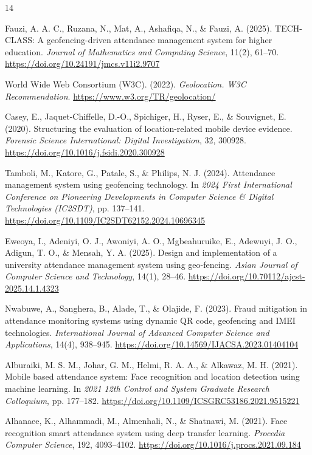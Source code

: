 \documentclass[runningheads]{llncs}
\begin{document}
%
\begin{thebibliography}{14}
\small

Fauzi, A. A. C., Ruzana, N., Mat, A., Ashafiqa, N., \& Fauzi, A. (2025). TECH-CLASS: A geofencing-driven attendance management system for higher education. \textit{Journal of Mathematics and Computing Science}, 11(2), 61--70. \url{https://doi.org/10.24191/jmcs.v11i2.9707}

World Wide Web Consortium (W3C). (2022). \textit{Geolocation. W3C Recommendation}. \url{https://www.w3.org/TR/geolocation/}

Casey, E., Jaquet-Chiffelle, D.-O., Spichiger, H., Ryser, E., \& Souvignet, E. (2020). Structuring the evaluation of location-related mobile device evidence. \textit{Forensic Science International: Digital Investigation}, 32, 300928. \url{https://doi.org/10.1016/j.fsidi.2020.300928}

Tamboli, M., Katore, G., Patale, S., \& Philips, N. J. (2024). Attendance management system using geofencing technology. In \textit{2024 First International Conference on Pioneering Developments in Computer Science \& Digital Technologies (IC2SDT)}, pp. 137--141. \url{https://doi.org/10.1109/IC2SDT62152.2024.10696345}

Eweoya, I., Adeniyi, O. J., Awoniyi, A. O., Mgbeahuruike, E., Adewuyi, J. O., Adigun, T. O., \& Mensah, Y. A. (2025). Design and implementation of a university attendance management system using geo-fencing. \textit{Asian Journal of Computer Science and Technology}, 14(1), 28--46. \url{https://doi.org/10.70112/ajcst-2025.14.1.4323}



Nwabuwe, A., Sanghera, B., Alade, T., \& Olajide, F. (2023). Fraud mitigation in attendance monitoring systems using dynamic QR code, geofencing and IMEI technologies. \textit{International Journal of Advanced Computer Science and Applications}, 14(4), 938--945. \url{https://doi.org/10.14569/IJACSA.2023.01404104}

Alburaiki, M. S. M., Johar, G. M., Helmi, R. A. A., \& Alkawaz, M. H. (2021). Mobile based attendance system: Face recognition and location detection using machine learning. In \textit{2021 12th Control and System Graduate Research Colloquium}, pp. 177--182. \url{https://doi.org/10.1109/ICSGRC53186.2021.9515221}

Alhanaee, K., Alhammadi, M., Almenhali, N., \& Shatnawi, M. (2021). Face recognition smart attendance system using deep transfer learning. \textit{Procedia Computer Science}, 192, 4093--4102. \url{https://doi.org/10.1016/j.procs.2021.09.184}


\end{thebibliography}
\end{document}
